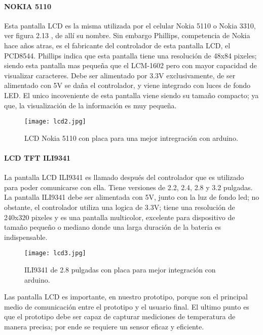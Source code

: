 \paragraph{NOKIA 5110}
Esta pantalla LCD es la misma utilizada por el celular Nokia 5110 o Nokia 3310, ver figura 2.13 , de allí su nombre\cite{nokia1}. 
Sin embargo Phillips, competencia de Nokia hace años atras, es el fabricante del controlador de esta pantalla LCD, el PCD8544. Phillips indica que esta pantalla tiene una resolución de 48x84 pixeles; siendo esta pantalla mas pequeña que el LCM-1602 pero con mayor capacidad de visualizar caracteres\cite{nokia2}. Debe ser alimentado por 3.3V exclusivamente, de ser alimentado con 5V se daña el controlador, y viene integrado con luces de fondo LED\cite{nokia2}. El unico incoveniente de esta pantalla viene siendo su tamaño compacto; ya que, la visualización de la información es muy pequeña.

\begin{figure}[H]
	\centering
	\texttt{[image: lcd2.jpg]}
	\caption{LCD Nokia 5110 con placa para una mejor intregración con arduino.}
\end{figure}

\paragraph{LCD TFT ILI9341}
La pantalla LCD ILI9341 es llamado después del controlador que es utilizado para poder comunicarse con ella. Tiene versiones de 2.2, 2.4, 2.8 y 3.2 pulgadas. La pantalla ILI9341 debe ser alimentada con 5V, junto con la luz de fondo led; no obstante, el controlador utiliza una logica de 3.3V; tiene una resolución de 240x320 pixeles y es una pantalla multicolor, excelente para dispositivo de tamaño pequeño o mediano donde una larga duración de la bateria es indispensable\cite{ili9341}. 

\begin{figure}[H]
	\centering
	\texttt{[image: lcd3.jpg]}
	\caption{ILI9341 de 2.8 pulgadas con placa para mejor integración con arduino.}
\end{figure} 

\par \noindent
Las pantalla LCD es importante, en nuestro prototipo, porque son el principal medio de comunicación entre el prototipo y el usuario final. El ultimo punto es que el prototipo debe ser capaz de capturar mediciones de temperatura de manera precisa; por ende se requiere un sensor eficaz y eficiente.


